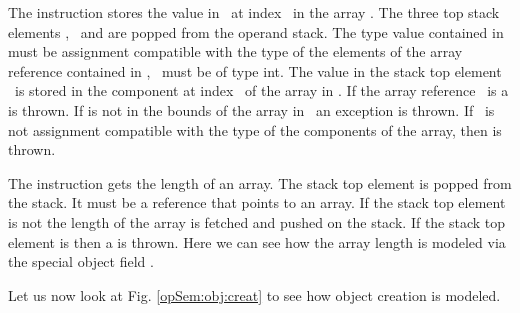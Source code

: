 The instruction \arrstore{} stores the value in \stackOnlyParam{\counterOnly} \ at index  \ in 
 the array  . 
The three top stack elements \stackOnlyParam{\counterOnly},  \  and  
are popped from the operand stack. The type value contained in \stackOnlyParam{\counterOnly} must be assignment 
compatible with the type
of the elements of the array reference contained in ,   \  must be of type int. 
The value in the stack top element \ is stored in the component at index  \  of the array  in  .
If the array reference  \ is \Mynull{} a \NullPointerExc{} is thrown. If     is not in the bounds of the array 
in   \ an \ArrIndexOutOfBoundExc{} exception is thrown. If \stackOnlyParam{\counterOnly} \ is not assignment 
compatible with the type of the components of the array, then \ArrStoreExc{}  is thrown.


The instruction \arraylength{} gets the length of an array.
 The stack top element is popped from the stack. It must be a 
reference that points to an array. If the stack top element is not \Mynull{}  the length of the array  
\length{\stackOnlyParam{\counterOnly} } is fetched and pushed on the stack.
If the stack top element is \Mynull{} then a \NullPointerExc{} is thrown. Here we can see how the array
 length is modeled via the special object field \length. 


Let us now look at Fig. \ref{opSem:obj:creat} to  see how 
object creation is modeled.

